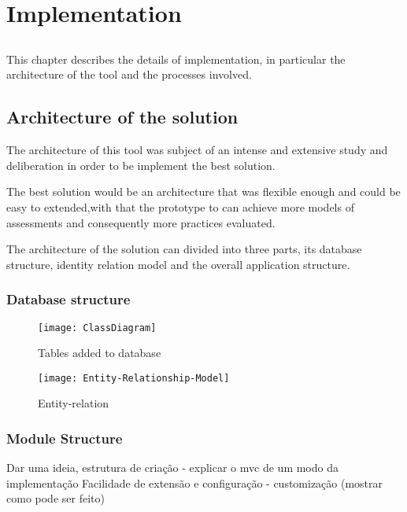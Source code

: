 \chapter{Implementation} \label{chap:implementation}

\section*{}

This chapter describes the details of implementation, in particular the architecture of the tool and the processes involved.

\section{Architecture of the solution} \label{sec:evaluation}
The architecture of this tool was subject of an intense and extensive study and deliberation in order to be implement the best solution.

The best solution would be an architecture that was flexible enough and could be easy to extended,with that the prototype to can achieve more models of assessments and consequently more practices evaluated.

The architecture of the solution can divided into three parts, its database structure, identity relation model and the overall application structure.

\subsection{Database structure}
\begin{figure}[h]
	\begin{center}
		\leavevmode
		\texttt{[image: ClassDiagram]}
		\caption{Tables added to database}
		\label{fig:database}
	\end{center}
\end{figure}

\begin{figure}[h]
	\begin{center}
		\leavevmode
		\texttt{[image: Entity-Relationship-Model]}
		\caption{Entity-relation}
		\label{fig:entity-relation}
	\end{center}
\end{figure}

\subsection{Module Structure}
Dar uma ideia, estrutura de criação - explicar o mvc de um modo da implementação
Facilidade de extensão e configuração - customização (mostrar como pode ser feito)

